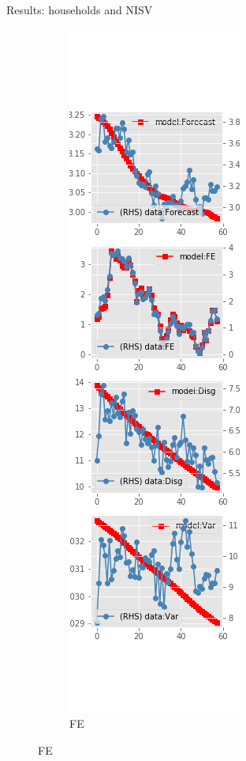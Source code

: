 \documentclass{beamer}
\begin{document}
\begin{frame}{Results: households and NISV}
\begin{figure}[ht]
\begin{subfigure}[b]{0.19\textwidth}
		\end{subfigure}
		\hfill
		\begin{subfigure}[b]{0.19\textwidth}
			\caption{FE}
			\includegraphics[width=\textwidth, height = 0.8\textheight]{figuresDraft/sce_ni_est_sv_diag1.png}

\end{subfigure}
\end{figure}
\end{frame}
\end{document}
